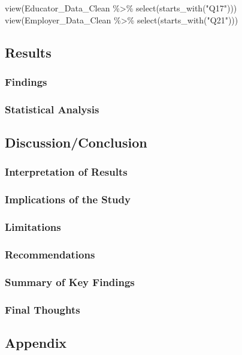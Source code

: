 \documentclass[
  11pt,
  letterpaper,
  DIV=11,
  numbers=noendperiod]{scrartcl}
\newenvironment{Shaded}{\begin{snugshade}}{\end{snugshade}}
\newcommand{\FunctionTok}[1]{\textcolor[rgb]{0.28,0.35,0.67}{#1}}
\newcommand{\NormalTok}[1]{\textcolor[rgb]{0.00,0.23,0.31}{#1}}
\newcommand{\SpecialCharTok}[1]{\textcolor[rgb]{0.37,0.37,0.37}{#1}}
\newcommand{\StringTok}[1]{\textcolor[rgb]{0.13,0.47,0.30}{#1}}
\begin{document}
\begin{Shaded}
\begin{Highlighting}[]
\FunctionTok{view}\NormalTok{(Educator\_Data\_Clean }\SpecialCharTok{\%\textgreater{}\%} \FunctionTok{select}\NormalTok{(}\FunctionTok{starts\_with}\NormalTok{(}\StringTok{"Q17"}\NormalTok{)))}
\FunctionTok{view}\NormalTok{(Employer\_Data\_Clean }\SpecialCharTok{\%\textgreater{}\%} \FunctionTok{select}\NormalTok{(}\FunctionTok{starts\_with}\NormalTok{(}\StringTok{"Q21"}\NormalTok{)))}
\end{Highlighting}
\end{Shaded}

\subsection{Results}\label{results}

\subsubsection{Findings}\label{findings}

\subsubsection{Statistical Analysis}\label{statistical-analysis}

\subsection{Discussion/Conclusion}\label{discussionconclusion}

\subsubsection{Interpretation of
Results}\label{interpretation-of-results}

\subsubsection{Implications of the
Study}\label{implications-of-the-study}

\subsubsection{Limitations}\label{limitations}

\subsubsection{Recommendations}\label{recommendations}

\subsubsection{Summary of Key Findings}\label{summary-of-key-findings}

\subsubsection{Final Thoughts}\label{final-thoughts}

\subsection{Appendix}\label{appendix}
\end{document}
